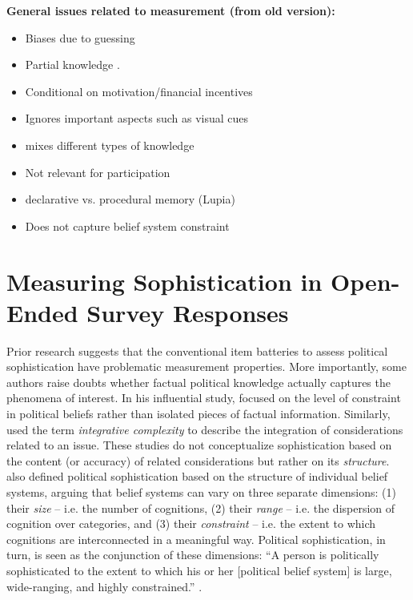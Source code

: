 \documentclass[12pt]{article}
\begin{document}
\noindent \textbf{General issues related to measurement (from old version):}
\begin{itemize}\singlespacing
   \item Biases due to guessing \citep[e.g.][]{mondak2004knowledge}
   \item Partial knowledge \citep[e.g.][]{debell2013harder}.
   \item Conditional on motivation/financial incentives \citep[e.g.][]{prior2008money}
   \item Ignores important aspects such as visual cues \citep{prior2014visual}
   \item mixes different types of knowledge \citep{barabas2014question}
   \item Not relevant for participation \citep{lupia2006elitism}
   \item declarative vs. procedural memory (Lupia)
   \item Does not capture belief system constraint \citep{luskin1987measuring,tetlock1983cognitive}
\end{itemize}



\section*{Measuring Sophistication in Open-Ended Survey Responses}

Prior research suggests that the conventional item batteries to assess political sophistication have problematic measurement properties. More importantly, some authors raise doubts whether factual political knowledge actually captures the phenomena of interest. In his influential study, \citet{converse1964nature} focused on the level of constraint in political beliefs rather than isolated pieces of factual information. Similarly, \citet{tetlock1983cognitive} used the term \textsl{integrative complexity} to describe the integration of considerations related to an issue. These studies do not conceptualize sophistication based on the content (or accuracy) of related considerations but rather on its \textsl{structure}. \citet{luskin1987measuring} also defined political sophistication based on the structure of individual belief systems, arguing that belief systems can vary on three separate dimensions: (1) their \textsl{size} -- i.e. the number of cognitions, (2) their \textsl{range} -- i.e. the dispersion of cognition over categories, and (3) their \textsl{constraint} -- i.e. the extent to which cognitions are interconnected in a meaningful way. Political sophistication, in turn, is seen as the conjunction of these dimensions: ``A person is politically sophisticated to the extent to which his or her [political belief system] is large, wide-ranging, and highly constrained.'' \citep[860]{luskin1987measuring}.
\end{document}
